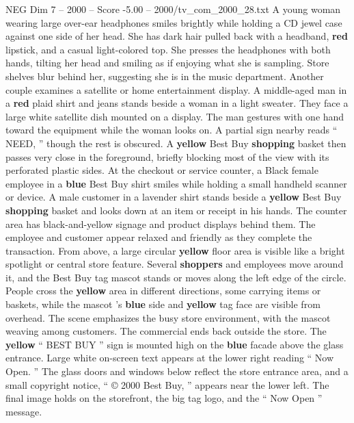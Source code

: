 \begin{textsample}{NEG Dim 7 – 2000 – Score -5.00 – 2000/tv\_com\_2000\_28.txt}
A young woman wearing large over-ear headphones smiles brightly while holding a CD jewel case against one side of her head.
She has dark hair pulled back with a headband, \textbf{red} lipstick, and a casual light-colored top.
She presses the headphones with both hands, tilting her head and smiling as if enjoying what she is sampling.
Store shelves blur behind her, suggesting she is in the music department.
Another couple examines a satellite or home entertainment display.
A middle-aged man in a \textbf{red} plaid shirt and jeans stands beside a woman in a light sweater.
They face a large white satellite dish mounted on a display.
The man gestures with one hand toward the equipment while the woman looks on.
A partial sign nearby reads “ NEED, ” though the rest is obscured.
A \textbf{yellow} Best Buy \textbf{shopping} basket then passes very close in the foreground, briefly blocking most of the view with its perforated plastic sides.
At the checkout or service counter, a Black female employee in a \textbf{blue} Best Buy shirt smiles while holding a small handheld scanner or device.
A male customer in a lavender shirt stands beside a \textbf{yellow} Best Buy \textbf{shopping} basket and looks down at an item or receipt in his hands.
The counter area has black-and-yellow signage and product displays behind them.
The employee and customer appear relaxed and friendly as they complete the transaction.
From above, a large circular \textbf{yellow} floor area is visible like a bright spotlight or central store feature.
Several \textbf{shoppers} and employees move around it, and the Best Buy tag mascot stands or moves along the left edge of the circle.
People cross the \textbf{yellow} area in different directions, some carrying items or baskets, while the mascot ’s \textbf{blue} side and \textbf{yellow} tag face are visible from overhead.
The scene emphasizes the busy store environment, with the mascot weaving among customers.
The commercial ends back outside the store.
The \textbf{yellow} “ BEST BUY ” sign is mounted high on the \textbf{blue} facade above the glass entrance.
Large white on-screen text appears at the lower right reading “ Now Open. ” The glass doors and windows below reflect the store entrance area, and a small copyright notice, “ {\EmojiFont ©} 2000 Best Buy, ” appears near the lower left.
The final image holds on the storefront, the big tag logo, and the “ Now Open ” message.

\end{textsample}

